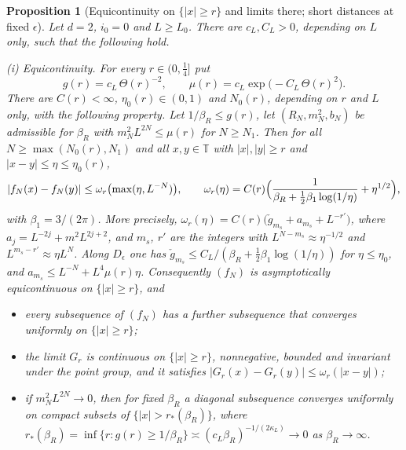 \documentclass[11pt]{amsart}
\newtheorem{proposition}[theorem]{Proposition}
\theoremstyle{definition}
\theoremstyle{remark}
\numberwithin{equation}{section}
\newcommand{\T}{\mathbb{T}}
\begin{document}
\begin{proposition}[Equicontinuity on $\{|x|\ge r\}$ and limits there; short distances at fixed $\epsilon$]\label{prop:equi-r}
Let $d=2$, $i_0=0$ and $L\ge L_0$. There are $c_L,C_L>0$, depending on $L$ only, such that the following hold.

\smallskip\noindent\textup{(i) Equicontinuity.} For every $r\in(0,\frac14]$ put
\[
g(r)=c_L\,\Theta(r)^{-2},\qquad \mu(r)=c_L\exp\bigl(-C_L\,\Theta(r)^{2}\bigr).
\]
There are $C(r)<\infty$, $\eta_0(r)\in(0,1)$ and $N_0(r)$, depending on $r$ and $L$ only, with the following property.
Let $1/\beta_R\le g(r)$, let $(R_N,m_N^2,b_N)$ be admissible for $\beta_R$ with $m_N^2L^{2N}\le\mu(r)$ for
$N\ge N_1$. Then for all $N\ge\max(N_0(r),N_1)$ and all $x,y\in\T$ with $|x|,|y|\ge r$ and $|x-y|\le\eta\le\eta_0(r)$,
\[
|f_N(x)-f_N(y)|\le\omega_r\bigl(\max(\eta,L^{-N})\bigr),\qquad
\omega_r(\eta)=C(r)\Bigl(\frac1{\beta_R+\frac12\beta_1\log(1/\eta)}+\eta^{1/2}\Bigr),
\]
with $\beta_1=3/(2\pi)$. More precisely, $\omega_r(\eta)=C(r)\bigl(\check g_{m_s}+a_{m_s}+L^{-r'}\bigr)$, where
$a_j=L^{-2j}+m^2L^{2j+2}$, and $m_s$, $r'$ are the integers with
$L^{N-m_s}\approx\eta^{-1/2}$ and $L^{m_s-r'}\approx\eta L^N$. Along $D_\epsilon$ one has
$\check g_{m_s}\le C_L/(\beta_R+\frac12\beta_1\log(1/\eta))$ for $\eta\le\eta_0$, and
$a_{m_s}\le L^{-N}+L^4\mu(r)\eta$. Consequently $(f_N)$ is asymptotically equicontinuous on $\{|x|\ge r\}$, and
\begin{itemize}
\item every subsequence of $(f_N)$ has a further subsequence that converges uniformly on $\{|x|\ge r\}$;
\item the limit $G_r$ is continuous on $\{|x|\ge r\}$, nonnegative, bounded and invariant under the point group, and it
satisfies $|G_r(x)-G_r(y)|\le\omega_r(|x-y|)$;
\item if $m_N^2L^{2N}\to0$, then for fixed $\beta_R$ a diagonal subsequence converges uniformly on compact subsets of
$\{|x|>r_*(\beta_R)\}$, where $r_*(\beta_R)=\inf\{r:g(r)\ge1/\beta_R\}\asymp(c_L\beta_R)^{-1/(2\kappa_L)}\to0$ as
$\beta_R\to\infty$.
\end{itemize}


\end{proposition}
\end{document}
